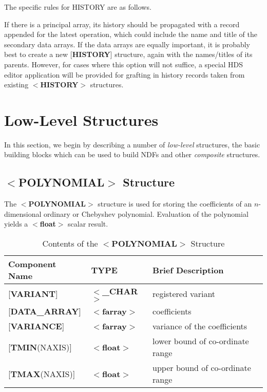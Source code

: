 \documentclass[twoside,11pt]{article}
\newcommand{\xlabel}[1]{}
\begin{document}
The specific rules for HISTORY are as follows.

If there is a principal array, its history should be propagated with
a record appended for the latest operation, which could include the
name and title of the secondary data arrays.  If the data arrays are
equally important, it is probably best
to create a new {[}{\bf HISTORY}{]} structure,
again with the names/titles of its parents.  However, for cases
where this option will not suffice, a special
HDS editor application will be provided for grafting
in history records taken from
existing $<${\bf HISTORY}$>$ structures.

\section{\xlabel{se_basic}Low-Level Structures\label{se:basic}}

In this section, we begin by describing a number of
{\it low-level} structures, the basic building blocks which
can be used to build NDFs and other {\it composite} structures.

\subsection{\xlabel{se_polynomial}$<${\bf POLYNOMIAL}$>$ Structure\label{se:spolynomial}}

The $<${\bf POLYNOMIAL}$>$ structure is used for storing the coefficients of an
$n$-dimensional ordinary or Chebyshev polynomial.  Evaluation of
the polynomial yields a $<${\bf float}$>$ scalar result.

\begin{table}[hbt]
\centering
\caption{Contents of the $<${\bf POLYNOMIAL}$>$ Structure}
\begin{tabular}{|l|l|l|}
\hline
Component Name & TYPE & Brief Description \\ \hline
{[}{\bf VARIANT}{]} & $<${\bf \_CHAR}$>$ & registered variant \\
{[}{\bf DATA\_ARRAY}{]} & $<${\bf farray}$>$ & coefficients \\
{[}{\bf VARIANCE}{]}  & $<${\bf farray}$>$ & variance of the coefficients \\
{[}{\bf TMIN}(NAXIS){]} & $<${\bf float}$>$ & lower bound of co-ordinate range\\
{[}{\bf TMAX}(NAXIS){]} & $<${\bf float}$>$ & upper bound of co-ordinate range\\ \hline
\end{tabular}
\end{table}
\end{document}
